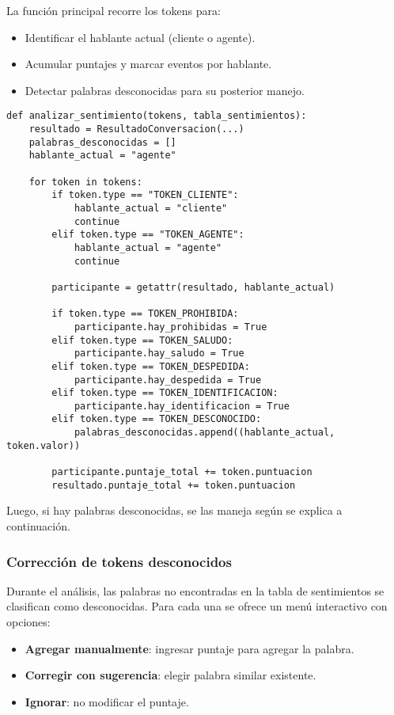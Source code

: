 La función principal recorre los tokens para:

\begin{itemize}
	\item Identificar el hablante actual (cliente o agente).
	\item Acumular puntajes y marcar eventos por hablante.
	\item Detectar palabras desconocidas para su posterior manejo.
\end{itemize}

\begin{verbatim}
def analizar_sentimiento(tokens, tabla_sentimientos):
    resultado = ResultadoConversacion(...)
    palabras_desconocidas = []
    hablante_actual = "agente"

    for token in tokens:
        if token.type == "TOKEN_CLIENTE":
            hablante_actual = "cliente"
            continue
        elif token.type == "TOKEN_AGENTE":
            hablante_actual = "agente"
            continue

        participante = getattr(resultado, hablante_actual)

        if token.type == TOKEN_PROHIBIDA:
            participante.hay_prohibidas = True
        elif token.type == TOKEN_SALUDO:
            participante.hay_saludo = True
        elif token.type == TOKEN_DESPEDIDA:
            participante.hay_despedida = True
        elif token.type == TOKEN_IDENTIFICACION:
            participante.hay_identificacion = True
        elif token.type == TOKEN_DESCONOCIDO:
            palabras_desconocidas.append((hablante_actual, token.valor))

        participante.puntaje_total += token.puntuacion
        resultado.puntaje_total += token.puntuacion
\end{verbatim}

Luego, si hay palabras desconocidas, se las maneja según se explica a continuación.

\subsubsection{Corrección de tokens desconocidos}

Durante el análisis, las palabras no encontradas en la tabla de sentimientos se clasifican como
desconocidas. Para cada una se ofrece un menú interactivo con opciones:

\begin{itemize}
	\item \textbf{Agregar manualmente}: ingresar puntaje para agregar la palabra.
	\item \textbf{Corregir con sugerencia}: elegir palabra similar existente.
	\item \textbf{Ignorar}: no modificar el puntaje.
\end{itemize}

